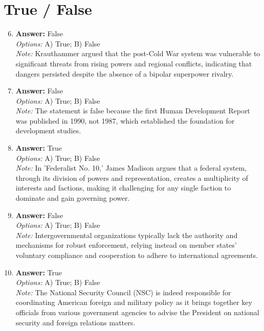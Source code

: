 \documentclass[12pt]{article}
\begin{document}
\section*{True / False}
\begin{enumerate}[label=\arabic*.]
\setcounter{enumi}{5}
\item \textbf{Answer:} False
\\ \textit{Options:} A) True; B) False
\\ \textit{Note:} Krauthammer argued that the post-Cold War system was vulnerable to significant threats from rising powers and regional conflicts, indicating that dangers persisted despite the absence of a bipolar superpower rivalry.
\item \textbf{Answer:} False
\\ \textit{Options:} A) True; B) False
\\ \textit{Note:} The statement is false because the first Human Development Report was published in 1990, not 1987, which established the foundation for development studies.
\item \textbf{Answer:} True
\\ \textit{Options:} A) True; B) False
\\ \textit{Note:} In 'Federalist No. 10,' James Madison argues that a federal system, through its division of powers and representation, creates a multiplicity of interests and factions, making it challenging for any single faction to dominate and gain governing power.
\item \textbf{Answer:} False
\\ \textit{Options:} A) True; B) False
\\ \textit{Note:} Intergovernmental organizations typically lack the authority and mechanisms for robust enforcement, relying instead on member states' voluntary compliance and cooperation to adhere to international agreements.
\item \textbf{Answer:} True
\\ \textit{Options:} A) True; B) False
\\ \textit{Note:} The National Security Council (NSC) is indeed responsible for coordinating American foreign and military policy as it brings together key officials from various government agencies to advise the President on national security and foreign relations matters.
\end{enumerate}
\end{document}
